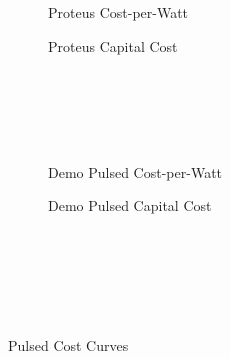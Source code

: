 \clearpage

\newpage

\begin{figure*}
    \centering
    \hfill 
    \begin{subfigure}[t]{0.45\textwidth}
        \centering
		\begin{adjustbox}{width=\textwidth}
			\Large
			
		\end{adjustbox}
        \caption{Proteus Cost-per-Watt}
    \end{subfigure}
    \hfill
    \begin{subfigure}[t]{0.45\textwidth}
        \centering
		\begin{adjustbox}{width=\textwidth}
			\Large
			
		\end{adjustbox}
        \caption{Proteus Capital Cost}
    \end{subfigure}
    \hfill \hfill ~\\ ~\\ ~\\ ~\\
    \hfill 
    \begin{subfigure}[t]{0.45\textwidth}
        \centering
		\begin{adjustbox}{width=\textwidth}
			\Large
			
		\end{adjustbox}
        \caption{Demo Pulsed Cost-per-Watt}
    \end{subfigure}
    \hfill
    \begin{subfigure}[t]{0.45\textwidth}
        \centering
		\begin{adjustbox}{width=\textwidth}
			\Large
			
		\end{adjustbox}
        \caption{Demo Pulsed Capital Cost}
    \end{subfigure}	
    \hfill \hfill ~\\ ~\\ ~\\
    \caption{Pulsed Cost Curves}
    \label{fig:pulsed_costs} ~ \\
\end{figure*}

